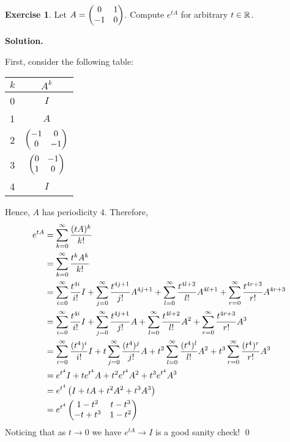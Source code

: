 \documentclass[12pt]{book}
\theoremstyle{definition}
\newtheorem{exercise}{Exercise}[chapter]
\newenvironment{solution}
{%
  \par\noindent\textbf{Solution.}\quad
}
{%
  \qed\par
}
\begin{document}
\begin{exercise}
  Let $A = \begin{pmatrix} 0 & 1 \\ -1 & 0 \end{pmatrix}$. Compute $e^{tA}$ for arbitrary $t \in \mathbb{R}$.
\end{exercise}

\begin{solution}
  First, consider the following table:

  \begin{table}[ht]
    \centering
    \begin{tabular}{c|c}

    $k$ & $A^k$  \\ 
    \hline
    0 & $I$ \\
    1 & $A$ \\
    2 & $\begin{pmatrix} -1 & 0 \\ 0 & -1 \end{pmatrix}$ \\
    3 & $\begin{pmatrix} 0 & -1 \\ 1 & 0 \end{pmatrix}$ \\
    4 & $I$ \\
    \end{tabular}
    \end{table}

  Hence, $A$ has periodicity $4$. 
  Therefore,
  \[
  \begin{aligned}
    e^{tA} &= \sum_{k=0}^\infty \frac{(tA)^k}{k!} \\
           &= \sum_{k=0}^\infty \frac{t^kA^k}{k!} \\
           &= \sum_{i=0}^\infty \frac{t^{4i}}{i!}I + \sum_{j=0}^\infty \frac{t^{4j + 1}}{j!}A^{4j+1} + \sum_{l=0}^\infty \frac{t^{4l + 2}}{l!}A^{4l+1} + \sum_{r=0}^\infty \frac{t^{4r + 3}}{r!}A^{4r+3} \\
           &= \sum_{i=0}^\infty \frac{t^{4i}}{i!}I + \sum_{j=0}^\infty \frac{t^{4j + 1}}{j!}A + \sum_{l=0}^\infty \frac{t^{4l + 2}}{l!}A^2 + \sum_{r=0}^\infty \frac{t^{4r + 3}}{r!}A^3 \\
           &= \sum_{i=0}^\infty \frac{(t^{4})^i}{i!}I + t\sum_{j=0}^\infty \frac{(t^{4})^j}{j!}A + t^2\sum_{l=0}^\infty \frac{(t^4)^l}{l!}A^2 + t^3\sum_{r=0}^\infty \frac{(t^4)^r}{r!}A^3 \\
           &= e^{t^4}I + te^{t^4}A + t^2e^{t^4}A^2 + t^3e^{t^4}A^3 \\
           &= e^{t^4}\left(I + tA + t^2A^2 + t^3A^3\right) \\
           &= e^{t^4} \begin{pmatrix} 1-t^2 & t - t^3 \\ -t + t^3 & 1 - t^2 \end{pmatrix}
  \end{aligned}
  \]  
  Noticing that as $t \to 0$ we have $e^{tA} \to I$ is a good sanity check!
\end{solution}
\end{document}
